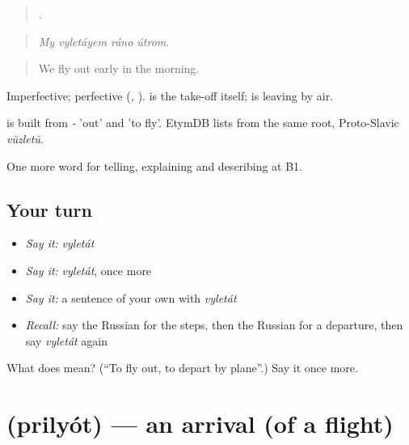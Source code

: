 \begin{quote}
   .
\end{quote}

\begin{quote}
\emph{My vyletáyem ráno útrom.}
\end{quote}

\begin{quote}
We fly out early in the morning.
\end{quote}

Imperfective; perfective \emph{} (\emph{, }). \emph{} is the take-off itself; \emph{} is leaving by air.

\begin{cousinweb}
\emph{} is built from \emph{-} 'out' and \emph{} 'to fly'. EtymDB lists \emph{} from the same root, Proto-Slavic \emph{vŭzletŭ}.
\end{cousinweb}

\begin{grammarlens}[title={What you've built}]
One more word for telling, explaining and describing at B1.
\end{grammarlens}

\subsection*{Your turn}
\begin{itemize}
\raggedright
  \item \emph{Say it:} \emph{vyletát}
  \item \emph{Say it:} \emph{vyletát}, once more
  \item \emph{Say it:} a sentence of your own with \emph{vyletát}
  \item \emph{Recall:} say the Russian for the steps, then the Russian for a departure, then say \emph{vyletát} again
\end{itemize}

\begin{tcolorbox}[breakable,colback=teal!4,colframe=teal!35!black,title={Before you move on}]
What does  mean? (\textquotedblleft{}To fly out, to depart by plane\textquotedblright{}.) Say it once more.
\end{tcolorbox}
\section[\texorpdfstring{\ru{прилёт} (prilyót)}{прилёт (prilyót)}]{ (prilyót) — an arrival (of a flight)}

